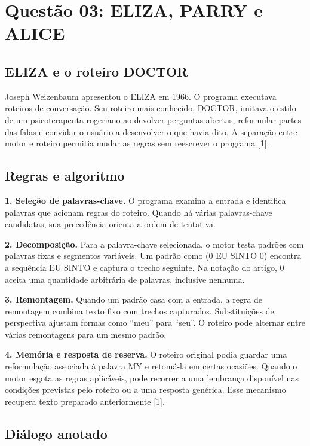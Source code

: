 \documentclass[12pt,a4paper]{article}
\begin{document}
\section{Questão 03: ELIZA, PARRY e ALICE}

\subsection{ELIZA e o roteiro DOCTOR}

Joseph Weizenbaum apresentou o ELIZA em 1966. O programa executava roteiros de conversação. Seu roteiro mais conhecido, DOCTOR, imitava o estilo de um psicoterapeuta rogeriano ao devolver perguntas abertas, reformular partes das falas e convidar o usuário a desenvolver o que havia dito. A separação entre motor e roteiro permitia mudar as regras sem reescrever o programa [1].

\subsection{Regras e algoritmo}

\textbf{1. Seleção de palavras-chave.} O programa examina a entrada e identifica palavras que acionam regras do roteiro. Quando há várias palavras-chave candidatas, sua precedência orienta a ordem de tentativa.

\textbf{2. Decomposição.} Para a palavra-chave selecionada, o motor testa padrões com palavras fixas e segmentos variáveis. Um padrão como (0 EU SINTO 0) encontra a sequência EU SINTO e captura o trecho seguinte. Na notação do artigo, 0 aceita uma quantidade arbitrária de palavras, inclusive nenhuma.

\textbf{3. Remontagem.} Quando um padrão casa com a entrada, a regra de remontagem combina texto fixo com trechos capturados. Substituições de perspectiva ajustam formas como ``meu'' para ``seu''. O roteiro pode alternar entre várias remontagens para um mesmo padrão.

\textbf{4. Memória e resposta de reserva.} O roteiro original podia guardar uma reformulação associada à palavra MY e retomá-la em certas ocasiões. Quando o motor esgota as regras aplicáveis, pode recorrer a uma lembrança disponível nas condições previstas pelo roteiro ou a uma resposta genérica. Esse mecanismo recupera texto preparado anteriormente [1].

\subsection{Diálogo anotado}
\end{document}
